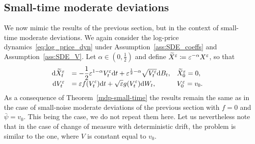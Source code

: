


\subsection{Small-time moderate deviations}
We now mimic the results of the previous section, but in the context of small-time moderate deviations. We again consider the log-price dynamics~\eqref{eq:log_price_dyn} under  Assumption~\ref{ass:SDE_coeffs} and Assumption~\ref{ass:SDE_V}.
Let $\alpha \in (0,\frac{1}{2})$ and define 
${\widetilde{X}^\varepsilon \coloneqq \varepsilon^{-\alpha} X^{\varepsilon}}$, so that
\begin{equation*}
\begin{array}{rll}
\mathrm{d}\widetilde{X}^\varepsilon_t
&= \displaystyle -\frac{1}{2}\varepsilon^{1-\alpha} V_t^{\varepsilon} \mathrm{d} t + \varepsilon^{\frac{1}{2}-\alpha}\sqrt{V_t^\varepsilon}\mathrm{d} B_t, 
& \widetilde{X}_0^\varepsilon = 0, \\
\mathrm{d} V_t^\varepsilon &= \displaystyle\varepsilon f(V_t^\varepsilon)\mathrm{d} t + \sqrt{\varepsilon}g(V_t^\varepsilon)\mathrm{d} W_t,  & V_0^\varepsilon = v_0.
\end{array}
\end{equation*}
As a consequence of Theorem~\ref{mdp-small-time} the results remain the same as in the case of small-noise moderate deviations of the previous section with $f = 0$ and $\bar\psi = v_0$. This being the case, we do not repeat them here. Let us nevertheless note that in the case of change of measure with deterministic drift, the problem is similar to the one, where $V$ is constant equal to $v_0$.
